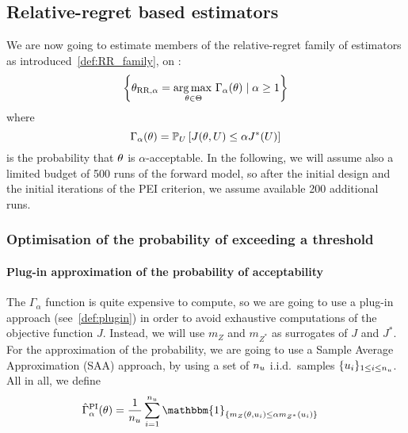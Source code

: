 \documentclass[../../Main_ManuscritThese.tex]{subfiles}
\newcommand\imgpath{/home/victor/acadwriting/Manuscrit/Text/Chapter5/img/}
\begin{document}
\subsection{Relative-regret based estimators}
\label{ssec:rr_estimators_croco}
We are now going to estimate members of the relative-regret family of
estimators as introduced~\cref{def:RR_family}, on
:
\begin{equation}
  \left\{\theta_{\mathrm{RR,\alpha}} = \operatorname*{arg\,max \,}_{\theta\in\Theta} \Gamma_{\alpha}(\theta) \mid \alpha \geq 1\right\}
\end{equation}
where
\begin{equation}
  \Gamma_{\alpha}(\theta) = \mathbb{P}_{U}\left[J(\theta,U) \leq \alpha J^*(U)\right]
\end{equation}
is the probability that $\theta$ is $\alpha$-acceptable.  In the
following, we will assume also a limited budget of \num{500} runs of
the forward model, so after the initial design and the initial
iterations of the PEI criterion, we assume available \num{200}
additional runs.
%  

\subsubsection{Optimisation of the probability of exceeding a threshold}
\label{ssec:optim_prob_threshold}
\paragraph{Plug-in approximation of the probability of acceptability}
The $\Gamma_{\alpha}$ function is quite expensive to compute, so we
are going to use a plug-in approach (see~\cref{def:plugin}) in order
to avoid exhaustive computations of the objective function
$J$. Instead, we will use $m_Z$ and $m_{Z^*}$ as surrogates of $J$ and
$J^*$.  For the approximation of the probability, we are going to use
a Sample Average Approximation (SAA) approach, by using a set of
$n_u$ i.i.d.\ samples $\{u_i\}_{1\leq i \leq n_{u}}$.  All in
all, we define
\begin{align}
  \hat{\Gamma}^{\mathrm{PI}}_{\alpha}(\kk) &= \frac{1}{n_\uu}\sum_{i=1}^{n_{\uu}} \mathbbm{1}_{\{m_Z(\kk, \uu_i) \leq \alpha m_{Z^*}(\uu_i)\}}
\end{align}
\end{document}
